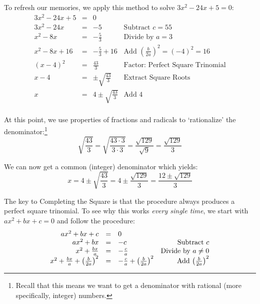 \documentclass{ximera}
\begin{document}

 

To refresh our memories, we apply this method to solve $3x^2 - 24x + 5 = 0$: \[ \begin{array}{rclr}

3x^2 - 24x + 5 & = & 0 & \\

3x^2 - 24x  & = & -5 & \text{Subtract  $c = 55$} \\

x^2 - 8x & = & -\frac{5}{3} & \text{Divide by $a = 3$} \\  

x^2 - 8x + 16 & = & -\frac{5}{3} + 16 & \text{Add $\left(\frac{b}{2a}\right)^2 = (-4)^2 = 16$} \\  

(x - 4)^2 & = & \frac{43}{3} & \text{Factor: Perfect Square Trinomial} \\

x - 4 & = & \pm \sqrt{\frac{43}{3}} & \text{Extract Square Roots} \\  

x & = & 4 \pm \sqrt{\frac{43}{3}} & \text{Add $4$} \\

\end{array}\]

At this point, we use properties of fractions and radicals to `rationalize' the denominator:\footnote{Recall that this means we want to get a denominator with rational (more specifically, integer) numbers.}  \[ \sqrt{\frac{43}{3}} = \sqrt{\frac{43 \cdot 3}{3 \cdot 3}} = \frac{\sqrt{129}}{\sqrt{9}} = \frac{\sqrt{129}}{3} \]

We can now get a common (integer) denominator which yields: \[x=  4 \pm \sqrt{\frac{43}{3}} = 4 \pm \frac{\sqrt{129}}{3} = \frac{12 \pm \sqrt{129}}{3} \]

The key to Completing the Square is that the procedure always produces a perfect square trinomial. To see why this works \textit{every single time}, we start with $ax^2 + bx + c = 0$ and follow the procedure:\[ \begin{array}{rclr}

ax^2 + bx + c & = & 0 & \\

ax^2 + bx & = & -c & \text{Subtract $c$} \\

x^2 + \frac{bx}{a} & = & -\frac{c}{a} & \text{Divide by $a \neq 0$} \\  

x^2 + \frac{bx}{a} + \left(\frac{b}{2a}\right)^2 & = & -\frac{c}{a} + \left(\frac{b}{2a}\right)^2 & \text{Add $ \left(\frac{b}{2a}\right)^2$} \\

\end{array} \]
\end{document}
